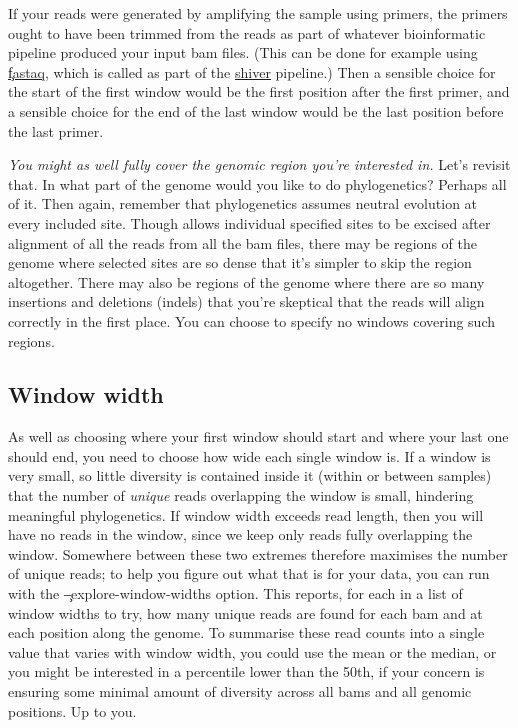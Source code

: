 If your reads were generated by amplifying the sample using primers, the primers ought to have been trimmed from the reads as part of whatever bioinformatic pipeline produced your input bam files.
(This can be done for example using \href{https://github.com/sanger-pathogens/Fastaq}{\color{blue} \underline{\c{fastaq}}}, which is called as part of the \href{https://github.com/ChrisHIV/shiver}{\c{\color{blue} \underline{shiver}}} pipeline.)
Then a sensible choice for the start of the first window would be the first position after the first primer, and a sensible choice for the end of the last window would be the last position before the last primer.

{\it You might as well fully cover the genomic region you're interested in.}
Let's revisit that.
In what part of the genome would you like to do phylogenetics?
Perhaps all of it.
Then again, remember that phylogenetics assumes neutral evolution at every included site.
Though \p allows individual specified sites to be excised after alignment of all the reads from all the bam files, there may be regions of the genome where selected sites are so dense that it's simpler to skip the region altogether.
There may also be regions of the genome where there are so many insertions and deletions (indels) that you're skeptical that the reads will align correctly in the first place.
You can choose to specify no windows covering such regions. 

\subsection{Window width}
As well as choosing where your first window should start and where your last one should end, you need to choose how wide each single window is.
If a window is very small, so little diversity is contained inside it (within or between samples) that the number of {\it unique} reads overlapping the window is small, hindering meaningful phylogenetics.
If window width exceeds read length, then you will have no reads in the window, since we keep only reads fully overlapping the window.
Somewhere between these two extremes therefore maximises the number of unique reads; to help you figure out what that is for your data, you can run \p with the \c{--explore-window-widths} option.
This reports, for each in a list of window widths to try, how many unique reads are found for each bam and at each position along the genome.
To summarise these read counts into a single value that varies with window width, you could use the mean or the median, or you might be interested in a percentile lower than the 50th, if your concern is ensuring some minimal amount of diversity across all bams and all genomic positions.
Up to you.

